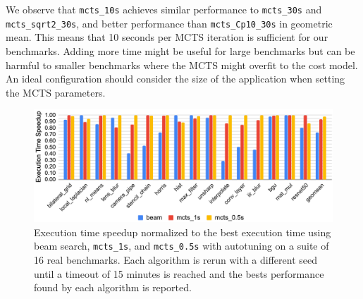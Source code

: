 We observe that \texttt{mcts\_10s} achieves similar performance to \texttt{mcts\_30s} and \texttt{mcts\_sqrt2\_30s}, and better performance than \texttt{mcts\_Cp10\_30s} in geometric mean. This means that 10 seconds per MCTS iteration is sufficient for our benchmarks. Adding more time might be useful for large benchmarks but can be harmful to smaller benchmarks where the MCTS might overfit to the cost model. An ideal configuration should consider the size of the application when setting the MCTS parameters.

\begin{figure}
    \centering
    \includegraphics[width=\textwidth]{figures/autotune2.png}
    \caption{Execution time speedup normalized to the best execution time using beam search, \texttt{mcts\_1s}, and \texttt{mcts\_0.5s} with autotuning on a suite of 16 real benchmarks. Each algorithm is rerun with a different seed until a timeout of 15 minutes is reached and the bests performance found by each algorithm is reported.}
    \label{fig:autotune}
\end{figure}


